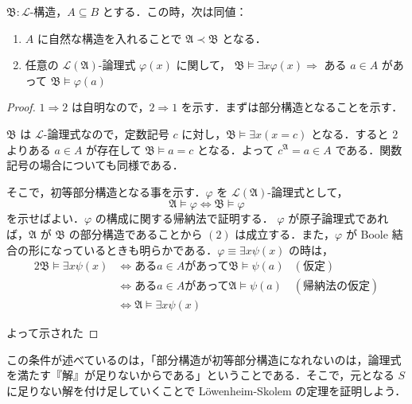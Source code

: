 \documentclass[a4j]{jsarticle}
\begin{document}
\begin{lemma}
 $\mathfrak{B}: \mathcal{L}$-構造，$A \subseteq B$ とする．この時，次は同値：
 \begin{enumerate}
  \item $A$ に自然な構造を入れることで $\mathfrak{A} \prec \mathfrak{B}$ となる．
  \item 任意の $\mathcal{L}(\mathfrak{A})$-論理式 $\varphi(x)$ に関して，
	 $\mathfrak{B} \models \exists x \varphi(x) \Longrightarrow$ ある $a \in A$ があって $\mathfrak{B} \models \varphi(a)$
 \end{enumerate}
\end{lemma}
\begin{proof}
 $1 \Longrightarrow 2$ は自明なので，$2 \Longrightarrow 1$ を示す．まずは部分構造となることを示す．
 
 $\mathfrak{B}$ は $\mathcal{L}$-論理式なので，定数記号 $c$ に対し，$\mathfrak{B} \models \exists x (x = c)$ となる．すると $2$ よりある $a \in A$ が存在して $\mathfrak{B} \models a = c$ となる．よって $c^\mathfrak{A} = a \in A$ である．関数記号の場合についても同様である．

 そこで，初等部分構造となる事を示す．$\varphi$ を $\mathcal{L}(\mathfrak{A})$-論理式として，
 \begin{equation}
  \mathfrak{A} \models \varphi \Leftrightarrow \mathfrak{B} \models \varphi\label{eqn:elementary}
 \end{equation} 
を示せばよい．$\varphi$ の構成に関する帰納法で証明する．
 $\varphi$ が原子論理式であれば，$\mathfrak{A}$ が $\mathfrak{B}$ の部分構造であることから $(2)$ は成立する．また，$\varphi$ が Boole 結合の形になっているときも明らかである．$\varphi \equiv \exists x \psi(x)$ の時は，
 \begin{alignat*}{2}
  \mathfrak{B} \models \exists x \psi(x) &\Leftrightarrow \text{ある} a \in A \text{があって} \mathfrak{B} \models \psi(a) & (\text{仮定})\\
  & \Leftrightarrow \text{ある} a \in A \text{があって} \mathfrak{A} \models \psi(a) & (\text{帰納法の仮定}) \\
  & \Leftrightarrow \mathfrak{A} \models \exists x \psi(x)
 \end{alignat*}

 よって示された\mbox{}
\end{proof}

この条件が述べているのは，「部分構造が初等部分構造になれないのは，論理式を満たす『解』が足りないからである」ということである．そこで，元となる $S$ に足りない解を付け足していくことで L\"{o}wenheim-Skolem の定理を証明しよう．
\end{document}
